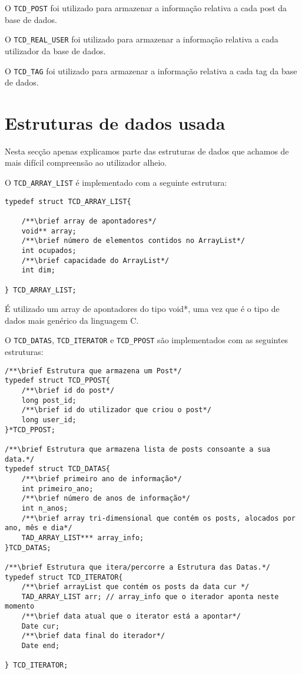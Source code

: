 \documentclass[4apaper]{report}
\begin{document}
O \texttt{TCD\_POST} foi utilizado para armazenar a informação relativa a cada post da base de dados.\newline

O \texttt{TCD\_REAL\_USER} foi utilizado para armazenar a informação relativa a cada utilizador da base de dados.\newline

O \texttt{TCD\_TAG} foi utilizado para armazenar a informação relativa a cada tag da base de dados.\newline

\newpage
\section{Estruturas de dados usada}

\label{sec:estruturaDeDadosUsada}

Nesta secção apenas explicamos parte das estruturas de dados que achamos de mais difícil compreensão ao utilizador alheio.\newline

O \texttt{TCD\_ARRAY\_LIST} é implementado com a seguinte estrutura:

\begin{verbatim}
typedef struct TCD_ARRAY_LIST{

    /**\brief array de apontadores*/
    void** array;
    /**\brief número de elementos contidos no ArrayList*/
    int ocupados;
    /**\brief capacidade do ArrayList*/
    int dim;

} TCD_ARRAY_LIST;
\end{verbatim}

É utilizado um array de apontadores do tipo void*, uma vez que é o tipo de dados mais genérico da linguagem C.\newline

O \texttt{TCD\_DATAS}, \texttt{TCD\_ITERATOR} e \texttt{TCD\_PPOST} são implementados com as seguintes estruturas:

\begin{verbatim}
/**\brief Estrutura que armazena um Post*/
typedef struct TCD_PPOST{
    /**\brief id do post*/
    long post_id;
    /**\brief id do utilizador que criou o post*/
    long user_id;
}*TCD_PPOST;

/**\brief Estrutura que armazena lista de posts consoante a sua data.*/
typedef struct TCD_DATAS{
    /**\brief primeiro ano de informação*/
    int primeiro_ano;
    /**\brief número de anos de informação*/
    int n_anos;
    /**\brief array tri-dimensional que contém os posts, alocados por ano, mês e dia*/
    TAD_ARRAY_LIST*** array_info;
}TCD_DATAS;

/**\brief Estrutura que itera/percorre a Estrutura das Datas.*/
typedef struct TCD_ITERATOR{
    /**\brief arrayList que contém os posts da data cur */
    TAD_ARRAY_LIST arr; // array_info que o iterador aponta neste momento
    /**\brief data atual que o iterator está a apontar*/
    Date cur;
    /**\brief data final do iterador*/
    Date end;

} TCD_ITERATOR;

\end{verbatim}
\end{document}
